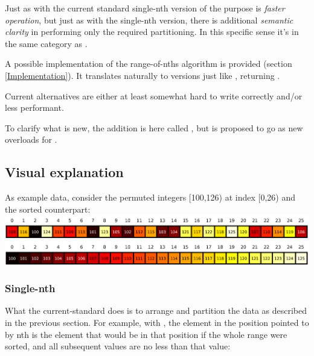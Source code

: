 Just as with the current standard single-nth version of  the purpose is \emph{faster operation}, but just as with the single-nth version, there is additional \emph{semantic clarity} in performing only the required partitioning. 
In this specific sense it's in the same category as .

A possible implementation of the range-of-nths algorithm is provided (section \ref{Implementation}).
It translates naturally to  versions just like , returning .

Current alternatives are either at least somewhat hard to write correctly and/or less performant.

To clarify what is new, the addition is here called , but is proposed to go as new overloads for . 

\newpage
\subsection{Visual explanation}

As example data, consider the permuted integers [100,126) at index [0,26) and the sorted counterpart:\\[0.41em]
\includegraphics[width=0.999\textwidth]{plotting/figs/rnd.png}\\[0.41em]
\includegraphics[width=0.999\textwidth]{plotting/figs/sort.png}\\[0.41em]

\subsubsection*{Single-nth }

What the current-standard  does is to arrange and partition the data as described in the previous section. For example, with , the element in the position pointed to by nth is the element that  would  be  in  that position if the whole range were sorted, and all subsequent values are no less than that value:

